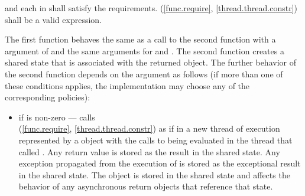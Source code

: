 \begin{itemdescr}
\pnum
\requires {} and each  in  shall
satisfy the
 requirements.
(\ref{func.require}, \ref{thread.thread.constr}) shall be a valid expression.

\pnum
\effects
The first function
behaves the same as a call to the second function with a  argument of
and the same arguments for  and .
The second function creates a shared state that is associated with
the returned  object.
The further behavior
of the second function depends on the  argument as follows (if
more than one of these conditions applies, the implementation may choose any of
the corresponding policies):

\begin{itemize}
\item
if  is non-zero --- calls
\\ 
(\ref{func.require}, \ref{thread.thread.constr})
as if in a new thread of execution represented by a  object
with the calls to  being evaluated in the thread that called .
Any return value
is stored as the result in the
shared state. Any exception propagated from
the execution of
is stored as the exceptional result in the shared state.
The  object is
stored in the shared state
and affects the behavior of any asynchronous return objects that
reference that state.


\end{itemize}
\end{itemdescr}
